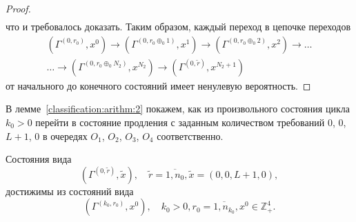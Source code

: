 \begin{proof}
\begin{multline*}
\end{multline*}
что и требовалось доказать. Таким образом,  каждый переход в цепочке переходов
\begin{multline*}
(\Gamma^{(0, r_0)}, x^0) \rightarrow (\Gamma^{(0, r_0\oplus_{0}1)}, x^1) \rightarrow (\Gamma^{(0, r_0\oplus_{0}2)},  x^2) \rightarrow \ldots \\ \ldots \rightarrow (\Gamma^{(0,  r_0\oplus_{0} N_2)},  x^{N_2})   \rightarrow (\Gamma^{(0,  \tilde{r})},  x^{N_2+1})
\end{multline*}
от начального до конечного состояний имеет ненулевую вероятность.
\end{proof}

В лемме~\ref{classification:arithm:2} покажем,  как из произвольного состояния цикла $k_0 > 0$ перейти в состояние продления с заданным количеством требований $0$,  $0$,  $L+1$,  $0$  в очередях $O_1$,  $O_2$,  $O_3$,  $O_4$ соответственно.
\begin{lemma}
Состояния вида 
$$(\Gamma^{(0,  \tilde{r})},  \tilde{x}),  \quad \tilde{r} = \overline{1,  n_0},  \tilde{x}=(0,  0,  L+1,  0), $$
 достижимы из состояний вида 
 \begin{equation*}
 (\Gamma^{(k_0,  r_0)},  x^0),  \quad k_0 > 0,  r_0=\overline{1,  n_{k_0}},  x^0 \in \mathbb{Z}_+^4.
 \end{equation*}
\label{classification:arithm:2}
\end{lemma}
